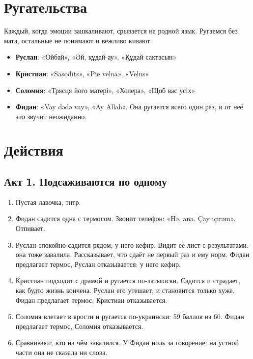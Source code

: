 \documentclass[12pt,a4paper]{article}
\begin{document}
\section*{Ругательства}

Каждый, когда эмоции зашкаливают, срывается на родной язык. Ругаемся без мата, остальные не понимают и вежливо кивают.

\begin{itemize}[leftmargin=*,nosep]
\item \textbf{Руслан}: «Ойбай», «Әй, құдай-ау», «Құдай сақтасын»
\item \textbf{Кристиан}: «Sasodīts», «Pie velna», «Velns»
\item \textbf{Соломия}: «Трясця його матері», «Холера», «Щоб вас усіх»
\item \textbf{Фидан}: «Vay dədə vay», «Ay Allah». Она ругается всего один раз, и от неё это звучит неожиданно.
\end{itemize}

\section*{Действия}

\subsection*{Акт 1. Подсаживаются по одному}
\begin{enumerate}[leftmargin=*]
\item Пустая лавочка, титр.
\item Фидан садится одна с термосом. Звонит телефон: «Hə, ana. Çay içirəm». Отпивает.
\item Руслан спокойно садится рядом, у него кефир. Видит её лист с результатами: она тоже завалила. Рассказывает, что сдаёт не первый раз и ему норм. Фидан предлагает термос, Руслан отказывается: у него кефир.
\item Кристиан подходит с драмой и ругается по-латышски. Садится и страдает, как будто жизнь кончена. Руслан его утешает, и становится только хуже. Фидан предлагает термос, Кристиан отказывается.
\item Соломия влетает в ярости и ругается по-украински: 59 баллов из 60. Фидан предлагает термос, Соломия отказывается.
\item Сравнивают, кто на чём завалился. У Фидан ноль за говорение: на устной части она не сказала ни слова.
\end{enumerate}
\end{document}

